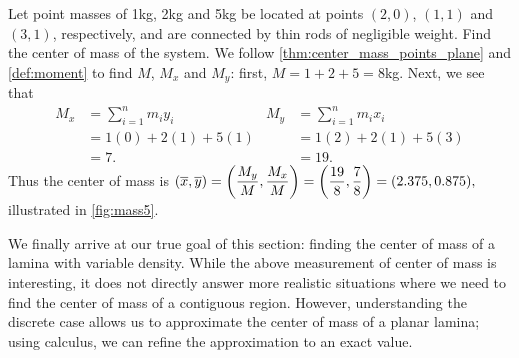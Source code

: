 \begin{example}\label{ex_mass5}%
Let point masses of 1kg, 2kg and 5kg be located at points $(2,0)$, $(1,1)$ and $(3,1)$, respectively, and are connected by thin rods of negligible weight. Find the center of mass of the system.
\solution
We follow \autoref{thm:center_mass_points_plane} and \autoref{def:moment} to find $M$, $M_x$ and $M_y$: first, $M = 1+2+5 = 8$kg.  Next, we see that
%
%
\begin{align*}
M_x &=  \sum_{i=1}^n m_iy_i & M_y &=  \sum_{i=1}^n m_i x_i \\
		&= 1(0) + 2(1) + 5(1) & &= 1(2) + 2(1) + 5(3) \\
		&= 7. & &= 19.
\end{align*}
Thus the center of mass is $\displaystyle (\overline{x},\overline{y}) = \left(\frac{M_y}{M},\frac{M_x}M\right) = \left(\frac{{19}}8,\frac78\right)  =(2.375,0.875),$ illustrated in \autoref{fig:mass5}.
\end{example}

We finally arrive at our true goal of this section: finding the center of mass of a lamina with variable density. While the above measurement of center of mass is interesting, it does not directly answer more realistic situations where we need to find the center of mass of a contiguous region. However, understanding the discrete case allows us to approximate the center of mass of a planar lamina; using calculus, we can refine the approximation to an exact value.


